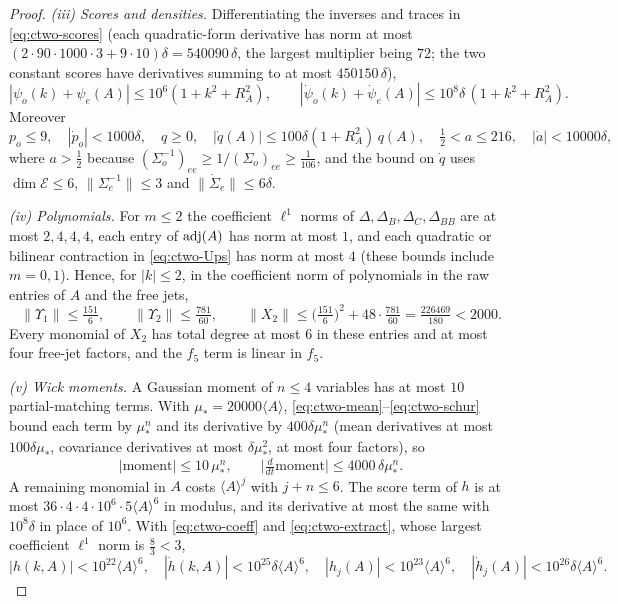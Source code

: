 \begin{proof}
\emph{(iii) Scores and densities.} Differentiating the inverses and traces in \eqref{eq:ctwo-scores} (each quadratic-form derivative has norm at most $(2\cdot90\cdot1000\cdot3+9\cdot10)\delta=540090\,\delta$, the largest multiplier being $72$; the two constant scores have derivatives summing to at most $450150\,\delta$),
\begin{equation}\label{eq:ctwo-score}
|\psi_o(k)+\psi_e(A)|\le10^6(1+k^2+R_A^2),\qquad |\dot\psi_o(k)+\dot\psi_e(A)|\le10^8\delta\,(1+k^2+R_A^2).
\end{equation}
Moreover
\begin{equation}\label{eq:ctwo-po}
p_o\le9,\quad |\dot p_o|<1000\delta,\quad q\ge0,\quad |\dot q(A)|\le100\delta(1+R_A^2)\,q(A),\quad \tfrac12<a\le216,\quad |\dot a|<10000\delta,
\end{equation}
where $a>\frac12$ because $(\Sigma_o^{-1})_{ee}\ge1/(\Sigma_o)_{ee}\ge\frac1{106}$, and the bound on $\dot q$ uses $\dim\mathcal E\le6$, $\|\Sigma_e^{-1}\|\le3$ and $\|\dot\Sigma_e\|\le6\delta$.

\emph{(iv) Polynomials.} For $m\le2$ the coefficient $\ell^1$ norms of $\Delta,\Delta_B,\Delta_C,\Delta_{BB}$ are at most $2,4,4,4$, each entry of $\operatorname{adj}(A)$ has norm at most $1$, and each quadratic or bilinear contraction in \eqref{eq:ctwo-Ups} has norm at most $4$ (these bounds include $m=0,1$). Hence, for $|k|\le2$, in the coefficient norm of polynomials in the raw entries of $A$ and the free jets,
\begin{equation}\label{eq:ctwo-coeff}
\|\Upsilon_1\|\le\tfrac{151}6,\qquad \|\Upsilon_2\|\le\tfrac{781}{60},\qquad \|X_2\|\le\bigl(\tfrac{151}6\bigr)^2+48\cdot\tfrac{781}{60}=\tfrac{226469}{180}<2000 .
\end{equation}
Every monomial of $X_2$ has total degree at most $6$ in these entries and at most four free-jet factors, and the $f_5$ term is linear in $f_5$.

\emph{(v) Wick moments.} A Gaussian moment of $n\le4$ variables has at most $10$ partial-matching terms. With $\mu_*=20000\langle A\rangle$, \eqref{eq:ctwo-mean}--\eqref{eq:ctwo-schur} bound each term by $\mu_*^n$ and its derivative by $400\delta\mu_*^n$ (mean derivatives at most $100\delta\mu_*$, covariance derivatives at most $\delta\mu_*^2$, at most four factors), so
\begin{equation}\label{eq:ctwo-wick}
|\text{moment}|\le10\,\mu_*^n,\qquad \bigl|\tfrac d{dt}\text{moment}\bigr|\le4000\,\delta\mu_*^n .
\end{equation}
A remaining monomial in $A$ costs $\langle A\rangle^j$ with $j+n\le6$. The score term of $h$ is at most $36\cdot4\cdot4\cdot10^6\cdot5\langle A\rangle^6$ in modulus, and its derivative at most the same with $10^8\delta$ in place of $10^6$. With \eqref{eq:ctwo-coeff} and \eqref{eq:ctwo-extract}, whose largest coefficient $\ell^1$ norm is $\frac83<3$,
\begin{equation}\label{eq:ctwo-hbd}
|h(k,A)|<10^{22}\langle A\rangle^6,\quad |\dot h(k,A)|<10^{25}\delta\langle A\rangle^6,\quad |h_j(A)|<10^{23}\langle A\rangle^6,\quad |\dot h_j(A)|<10^{26}\delta\langle A\rangle^6 .
\end{equation}


\end{proof}
